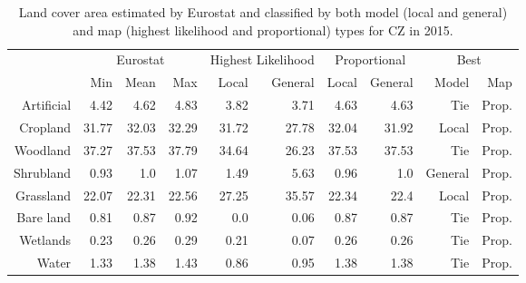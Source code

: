 \begin{table}[H]
\centering
\caption{Land cover area estimated by Eurostat and classified by both model (local and general) and map (highest likelihood and proportional) types for CZ in 2015.}

\begin{tabular}{r|rrr|rr|rr|rr}
\toprule
{} & \multicolumn{3}{|c}{Eurostat} & \multicolumn{2}{|c}{Highest Likelihood} & \multicolumn{2}{|c}{Proportional} & \multicolumn{2}{|c}{Best} \\
{} &      Min &   Mean &    Max &              Local & General &        Local & General &    Model &    Map \\
\midrule
Artificial &     4.42 &   4.62 &   4.83 &               3.82 &    3.71 &         4.63 &    4.63 &      Tie &  Prop. \\
Cropland   &    31.77 &  32.03 &  32.29 &              31.72 &   27.78 &        32.04 &   31.92 &    Local &  Prop. \\
Woodland   &    37.27 &  37.53 &  37.79 &              34.64 &   26.23 &        37.53 &   37.53 &      Tie &  Prop. \\
Shrubland  &     0.93 &    1.0 &   1.07 &               1.49 &    5.63 &         0.96 &     1.0 &  General &  Prop. \\
Grassland  &    22.07 &  22.31 &  22.56 &              27.25 &   35.57 &        22.34 &    22.4 &    Local &  Prop. \\
Bare land  &     0.81 &   0.87 &   0.92 &                0.0 &    0.06 &         0.87 &    0.87 &      Tie &  Prop. \\
Wetlands   &     0.23 &   0.26 &   0.29 &               0.21 &    0.07 &         0.26 &    0.26 &      Tie &  Prop. \\
Water      &     1.33 &   1.38 &   1.43 &               0.86 &    0.95 &         1.38 &    1.38 &      Tie &  Prop. \\
\bottomrule
\end{tabular}
\end{table}

